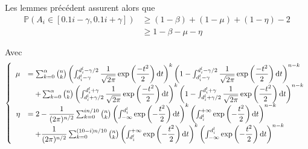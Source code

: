 Les lemmes précédent assurent alors que 
\begin{align*}
    \mathbb P\left( A_i \in [0.1i-\gamma, 0.1i + \gamma] \right) & \geq (1 - \beta) + (1 - \mu) + (1 - \eta) - 2\\
    & \geq 1 - \beta - \mu - \eta
\end{align*}

Avec 
\[
    \left\{ 
        \begin{array}{rl}
            \mu & = \sum_{k = 0}^\alpha \binom{n}{k}\left( \int_{d^l_i - \gamma}^{d^l_i -\gamma/2}\dfrac{1}{\sqrt{2\pi}} \exp\left( \dfrac{-t^2}{2} \right)\mathrm{d} t \right)^k \left( 1 - \int_{d^l_i - \gamma}^{d^l_i -\gamma/2}\dfrac{1}{\sqrt{2\pi}} \exp\left( \dfrac{-t^2}{2} \right)\mathrm{d} t \right)^{n - k}\\
            & \quad + \sum_{k = 0}^\alpha \binom{n}{k}\left( \int_{d^l_i + \gamma/2}^{d^l_i +\gamma}\dfrac{1}{\sqrt{2\pi}} \exp\left( \dfrac{-t^2}{2} \right)\mathrm{d} t \right)^k \left( 1 - \int_{d^l_i + \gamma/2}^{d^l_i +\gamma}\dfrac{1}{\sqrt{2\pi}} \exp\left( \dfrac{-t^2}{2} \right)\mathrm{d} t\right)^{n - k}\\
            \eta & = 2 - \dfrac{1}{(2\pi)^{n/2}}\sum_{k = 0}^{in/10}\binom{n}{k}\left( \int_{-\infty}^{d^l_i}\exp\left( -\dfrac{t^2}{2} \right)\mathrm{d} t \right)^k \left( \int_{d^l_i}^{+\infty}\exp\left( -\dfrac{t^2}{2} \right)\mathrm{d} t  \right)^{n - k}\\
            & \quad + \dfrac{1}{(2\pi)^{n/2}}\sum_{k = 0}^{(10-i)n/10}\binom{n}{k}\left( \int_{d^l_i}^{+\infty}\exp\left( -\dfrac{t^2}{2} \right)\mathrm{d} t \right)^k \left( \int_{-\infty}^{d^l_i}\exp\left( -\dfrac{t^2}{2} \right)\mathrm{d} t  \right)^{n - k} 
        \end{array}
    \right.    
\]
\newpage
\printbibliography


 